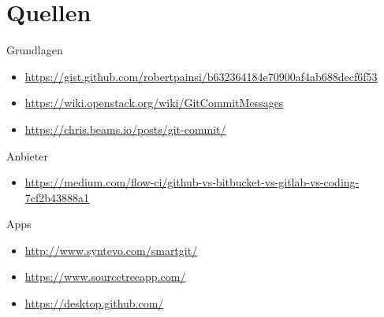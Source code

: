 \section*{Quellen}
\begin{frame}
\tiny
Grundlagen
\begin{itemize}
\item \url{https://gist.github.com/robertpainsi/b632364184e70900af4ab688decf6f53}
\item \url{https://wiki.openstack.org/wiki/GitCommitMessages}
\item \url{https://chris.beams.io/posts/git-commit/}
\end{itemize}
Anbieter
\begin{itemize}
\item \url{https://medium.com/flow-ci/github-vs-bitbucket-vs-gitlab-vs-coding-7cf2b43888a1}
\end{itemize}
Apps
\begin{itemize}
\item \url{http://www.syntevo.com/smartgit/}
\item \url{https://www.sourcetreeapp.com/}
\item \url{https://desktop.github.com/}
\end{itemize}
\end{frame}